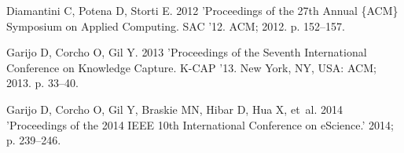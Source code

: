 \documentclass{doublecol-new}
\def\newblock{\hskip .11em plus .33em minus .07em}
\theoremstyle{TH}{
\newtheorem{lemma}{Lemma}
\newtheorem{theorem}[lemma]{Theorem}
\newtheorem{corrolary}[lemma]{Corrolary}
\newtheorem{conjecture}[lemma]{Conjecture}
\newtheorem{proposition}[lemma]{Proposition}
\newtheorem{claim}[lemma]{Claim}
\newtheorem{stheorem}[lemma]{Wrong Theorem}
\newtheorem{algorithm}{Algorithm}
}
\theoremstyle{THrm}{
\newtheorem{definition}{Definition}[section]
\newtheorem{question}{Question}[section]
\newtheorem{remark}{Remark}
\newtheorem{scheme}{Scheme}
}
\theoremstyle{THhit}{
\newtheorem{case}{Case}[section]
}
\begin{document}
\begin{thebibliography}{10}
Diamantini C, Potena D, Storti E. {2012} 'Proceedings of the 27th Annual \{ACM\} Symposium on Applied
Computing. SAC '12. ACM; 2012. p. 152--157.


Garijo D, Corcho O, Gil Y. {2013} 'Proceedings of the Seventh International Conference on Knowledge
Capture. K-CAP '13. New York, NY, USA: ACM; 2013. p. 33--40.


Garijo D, Corcho O, Gil Y, Braskie MN, Hibar D, Hua X, et~al. {2014} 'Proceedings of the 2014 IEEE 10th International Conference on
eScience.' 2014; p. 239--246.










\end{thebibliography}
\end{document}
